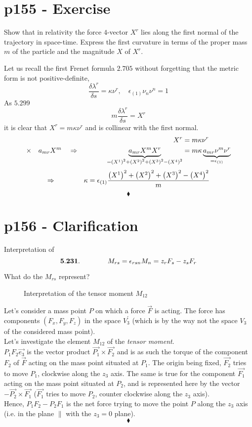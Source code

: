 \section{p155 - Exercise}
\begin{tcolorbox}
Show that in relativity the force $4$-vector $X^r$ lies along the first normal of the trajectory in space-time. Express the first curvature in terms of the proper mass $m$ of the particle and the magnitude $X$ of $ X^r$.
\end{tcolorbox}
Let us recall the first Frenet formula $\mathbf{2.705}$ without forgetting that the metric form is not positive-definite, $$\frac{\delta \lambda^r}{\delta s}=\kappa\nu^r,\quad \epsilon_{(1)}\nu_n\nu^n=1$$ As $\mathbf{5.299}$ $$m\frac{\delta \lambda^r}{\delta s}=X^r$$ it is clear that $X^r = m\kappa\nu^r$ and is collinear with the first normal.
\begin{align}
X^r &= m\kappa\nu^r\\
\times \quad a_{mr}X^m\quad\Rightarrow\quad\quad\quad\quad \underbrace{a_{mr}X^mX^r}_{=\left(X^1\right)^2+\left(X^2\right)^2+\left(X^3\right)^2-\left(X^4\right)^2} &= m\kappa \underbrace{a_{mr}\nu^m\nu^r}_{= \epsilon_{(1)}}
\end{align}
\textbf{$$\Rightarrow\quad\quad\quad\quad \kappa = \epsilon_{(1)}\frac{\left(X^1\right)^2+\left(X^2\right)^2+\left(X^3\right)^2-\left(X^4\right)^2}{m}
$$}
$$\blacklozenge$$
\newpage


\section{p156 - Clarification}
\begin{tcolorbox}
Interpretation of 
$$\mathbf{5.231.}\quad\quad\quad\quad M_{rs}=\epsilon_{rsn}M_n=z_rF_s-z_sF_r$$
\end{tcolorbox}
What do the $M_{rs}$ represent?
\begin{figure}[H]

\caption{Interpretation of the tensor moment $M_{12}$}
\label{fig:fig_p156_5320}
\end{figure}
Let's consider a mass point $P$ on which a force $\overrightarrow{F}$ is acting. The force has components $\left(F_x,F_y,F_z\right)$ in the  space $V^{'}_3$ (which is by the way not the space $V_3$ of the considered mass point).\\
Let's investigate the element $M_{12}$ of the \textit{tensor moment}.\\
$P_1F_2\overrightarrow{e_3}$ is the vector product $\overrightarrow{P_1}\times\overrightarrow{F_2}$ and is as such the torque of the component $F_2$ of $\overrightarrow{F}$ acting on the mass point situated at $P_1$. The origin being fixed, $\overrightarrow{F_2}$ tries to move $P_1$, clockwise along the $z_3$ axis. The same is true for the component $\overrightarrow{F_1}$ acting on the mass point situated at $P_2$, and is represented here by the vector $- \overrightarrow{P_2}\times\overrightarrow{F_1}$ ($\overrightarrow{F_1}$ tries to move  $P_2$, counter clockwise along the $z_3$ axis). \\
Hence, $P_1F_2-P_2F_1$ is the net force trying to move the point $P$ along the $z_3$ axis (i.e. in the plane $\parallel$ with the $z_3=0$ plane).
$$\blacklozenge$$
\newpage


